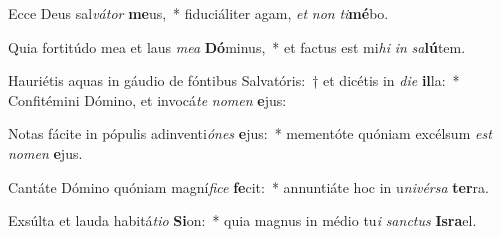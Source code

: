 \item Ecce Deus sal\textit{vá}\textit{tor} \textbf{me}us,~* fiduciáliter agam, \textit{et} \textit{non} \textit{ti}\textbf{mé}bo.
\item Quia fortitúdo mea et laus \textit{me}\textit{a} \textbf{Dó}minus,~* et factus est mi\textit{hi} \textit{in} \textit{sa}\textbf{lú}tem.
\item Hauriétis aquas in gáudio de fóntibus Salvatóris:~† et dicétis in \textit{di}\textit{e} \textbf{il}la:~* Confitémini Dómino, et invocá\textit{te} \textit{no}\textit{men} \textbf{e}jus:
\item Notas fácite in pópulis adinventi\textit{ó}\textit{nes} \textbf{e}jus:~* mementóte quóniam excélsum \textit{est} \textit{no}\textit{men} \textbf{e}jus.
\item Cantáte Dómino quóniam magní\textit{fi}\textit{ce} \textbf{fe}cit:~* annuntiáte hoc in u\textit{ni}\textit{vér}\textit{sa} \textbf{ter}ra.
\item Exsúlta et lauda habitá\textit{ti}\textit{o} \textbf{Si}on:~* quia magnus in médio tu\textit{i} \textit{sanc}\textit{tus} \textbf{Is}\textbf{ra}el.

